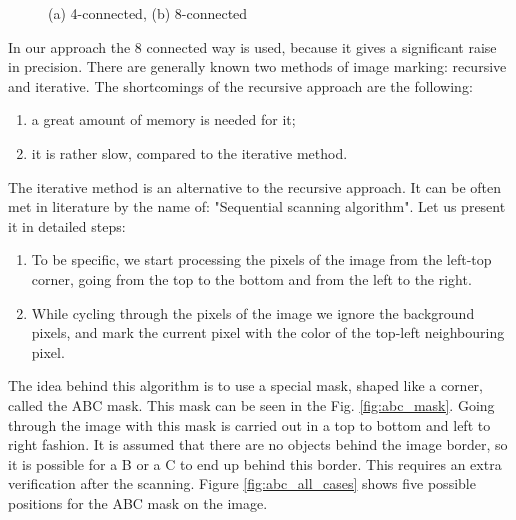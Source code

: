 \documentclass[12pt,a4paper,oneside,titlepage]{article}
\begin{document}
\begin{figure}[h]
\begin{minipage}[h]{0.49\linewidth}
\end{minipage}
\hfill
\begin{minipage}[h]{0.49\linewidth}
\end{minipage}
\caption{(a) 4-connected, (b) 8-connected}
\label{ris:connections}
\end{figure}



In our approach the 8 connected way is used, because it gives a significant raise in precision.
There are generally known two methods of image marking: recursive and iterative.
The shortcomings of the recursive approach are the following:
\begin{enumerate}
  \item a great amount of memory is needed for it;
  \item it is rather slow, compared to the iterative method.
\end{enumerate}
The iterative method is an alternative to the recursive approach. It can be often met in literature by the name of: "Sequential scanning algorithm".
Let us present it in detailed steps:

\begin{enumerate}
  \item To be specific, we start processing the pixels of the image from the left-top corner, going from the top to the bottom and from the left to the right.
  \item While cycling through the pixels of the image we ignore the background pixels, and mark the current pixel with the color of the top-left neighbouring pixel.
\end{enumerate}

The idea behind this algorithm is to use a special mask, shaped like a corner, called the ABC mask. 
This mask can be seen in the Fig. \ref{fig:abc_mask}.
Going through the image with this mask is carried out in a top to bottom and left to right fashion.
It is assumed that there are no objects behind the image border, so it is possible for a B or a C to end up behind this border.
This requires an extra verification after the scanning.
Figure \ref{fig:abc_all_cases} shows five possible positions for the ABC mask on the image.
\end{document}
